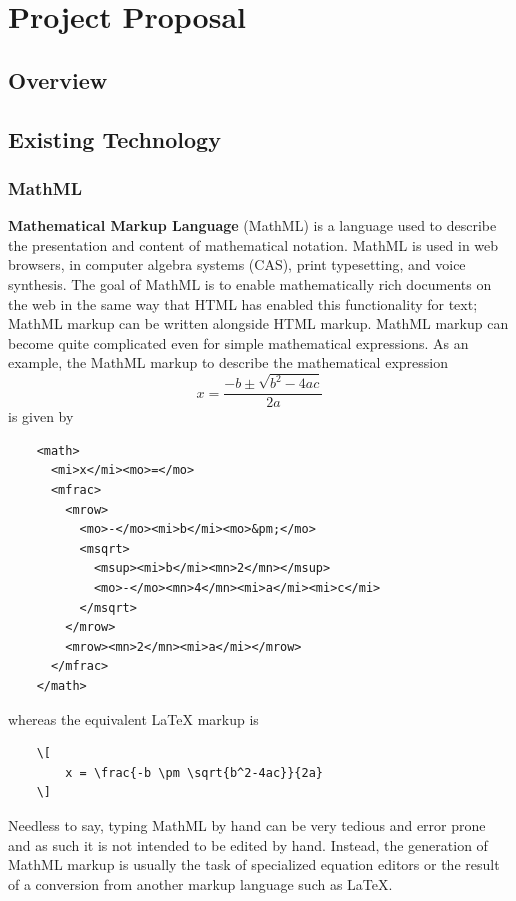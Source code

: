 \documentclass[11pt]{article}
\theoremstyle{theorem}
\theoremstyle{definition}
\begin{document}
\section{Project Proposal}



\subsection{Overview}

\subsection{Existing Technology}

\subsubsection{MathML}
\textbf{Mathematical Markup Language} (MathML) is a language used to describe the presentation and content of mathematical notation.  MathML is used in web browsers, in computer algebra systems (CAS), print typesetting, and voice synthesis.  The goal of MathML is to enable mathematically rich documents on the web in the same way that HTML has enabled this functionality for text; MathML markup can be written alongside HTML markup.  MathML markup can become quite complicated even for simple mathematical expressions.  As an example, the MathML markup to describe the mathematical expression
\[
x = \frac{-b \pm\sqrt{b^2-4ac}}{2a}
\]
is given by
\begin{verbatim}
    <math>
      <mi>x</mi><mo>=</mo>
      <mfrac>
        <mrow>
          <mo>-</mo><mi>b</mi><mo>&pm;</mo>
          <msqrt>
            <msup><mi>b</mi><mn>2</mn></msup>
            <mo>-</mo><mn>4</mn><mi>a</mi><mi>c</mi>
          </msqrt>
        </mrow>
        <mrow><mn>2</mn><mi>a</mi></mrow>
      </mfrac>
    </math>
\end{verbatim}
whereas the equivalent LaTeX markup is
\begin{verbatim}
    \[
        x = \frac{-b \pm \sqrt{b^2-4ac}}{2a}
    \]
\end{verbatim}
Needless to say, typing MathML by hand can be very tedious and error prone and as such it is not intended to be edited by hand.  Instead, the generation of MathML markup is usually the task of specialized equation editors or the result of a conversion from another markup language such as LaTeX.
 
\end{document}

